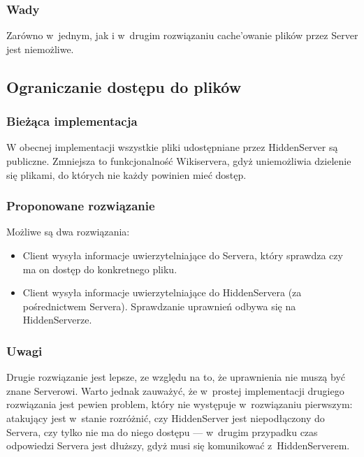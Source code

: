 \documentclass[a4paper,notitlepage]{article}
\begin{document}
\subsubsection*{Wady}
Zarówno w~jednym, jak i w~drugim rozwiązaniu cache'owanie plików przez
Server jest niemożliwe.


\subsection{Ograniczanie dostępu do plików}
\subsubsection*{Bieżąca implementacja}
W obecnej implementacji wszystkie pliki udostępniane przez HiddenServer 
są publiczne. Zmniejsza to funkcjonalność Wikiservera, gdyż uniemożliwia
dzielenie się plikami, do których nie każdy powinien mieć dostęp.

\subsubsection*{Proponowane rozwiązanie}
Możliwe są dwa rozwiązania:
\begin{itemize}
\item Client wysyła informacje uwierzytelniające do Servera, który sprawdza
czy ma on dostęp do konkretnego pliku.
\item Client wysyła informacje uwierzytelniające do HiddenServera 
(za pośrednictwem Servera). Sprawdzanie uprawnień odbywa się na HiddenServerze.
\end{itemize}
\subsubsection*{Uwagi}
Drugie rozwiązanie jest lepsze, ze względu na to, że uprawnienia 
nie muszą być znane Serverowi. Warto jednak zauważyć, że w~prostej
implementacji drugiego rozwiązania jest pewien problem, który nie występuje
w~rozwiązaniu pierwszym: atakujący jest w~stanie rozróżnić, czy HiddenServer
jest niepodłączony do Servera, czy tylko nie ma do niego dostępu --- 
w~drugim przypadku czas odpowiedzi Servera jest dłuższy, gdyż musi
się komunikować z~HiddenServerem.
\end{document}
